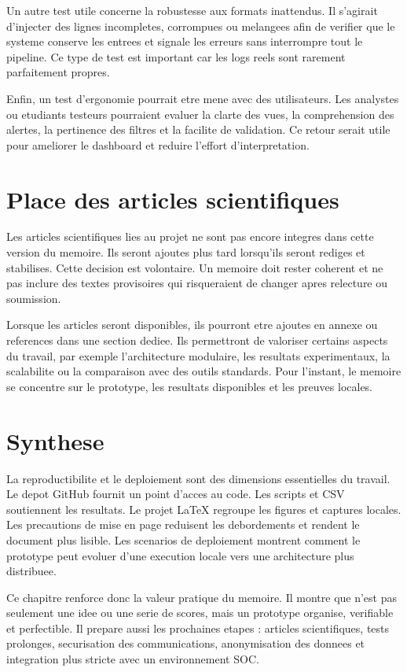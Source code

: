 Un autre test utile concerne la robustesse aux formats inattendus. Il s'agirait d'injecter des lignes incompletes, corrompues ou melangees afin de verifier que le systeme conserve les entrees et signale les erreurs sans interrompre tout le pipeline. Ce type de test est important car les logs reels sont rarement parfaitement propres.

Enfin, un test d'ergonomie pourrait etre mene avec des utilisateurs. Les analystes ou etudiants testeurs pourraient evaluer la clarte des vues, la comprehension des alertes, la pertinence des filtres et la facilite de validation. Ce retour serait utile pour ameliorer le dashboard et reduire l'effort d'interpretation.

\section{Place des articles scientifiques}
Les articles scientifiques lies au projet ne sont pas encore integres dans cette version du memoire. Ils seront ajoutes plus tard lorsqu'ils seront rediges et stabilises. Cette decision est volontaire. Un memoire doit rester coherent et ne pas inclure des textes provisoires qui risqueraient de changer apres relecture ou soumission.

Lorsque les articles seront disponibles, ils pourront etre ajoutes en annexe ou references dans une section dediee. Ils permettront de valoriser certains aspects du travail, par exemple l'architecture modulaire, les resultats experimentaux, la scalabilite ou la comparaison avec des outils standards. Pour l'instant, le memoire se concentre sur le prototype, les resultats disponibles et les preuves locales.

\section{Synthese}
La reproductibilite et le deploiement sont des dimensions essentielles du travail. Le depot GitHub fournit un point d'acces au code. Les scripts et CSV soutiennent les resultats. Le projet LaTeX regroupe les figures et captures locales. Les precautions de mise en page reduisent les debordements et rendent le document plus lisible. Les scenarios de deploiement montrent comment le prototype peut evoluer d'une execution locale vers une architecture plus distribuee.

Ce chapitre renforce donc la valeur pratique du memoire. Il montre que \logminer{} n'est pas seulement une idee ou une serie de scores, mais un prototype organise, verifiable et perfectible. Il prepare aussi les prochaines etapes : articles scientifiques, tests prolonges, securisation des communications, anonymisation des donnees et integration plus stricte avec un environnement SOC.
